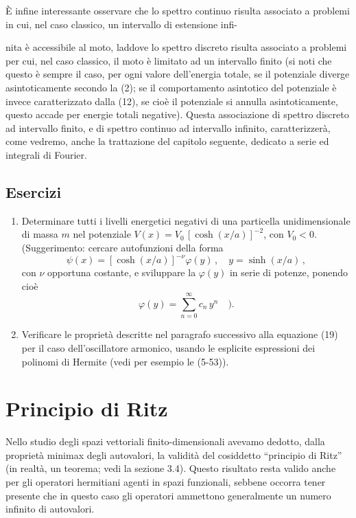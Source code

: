 \documentclass[11pt, a4paper]{book}
\numberwithin{equation}{section}
\newenvironment{esercizi}{\subsection*{Esercizi}\begin{enumerate}}{\end{enumerate}}
\begin{document}
È infine interessante osservare che lo spettro continuo risulta associato a problemi in cui, nel caso classico, un intervallo di estensione infi-


nita è accessibile al moto, laddove lo spettro discreto risulta associato a problemi per cui, nel caso classico, il moto è limitato ad un
intervallo finito (si noti che questo è sempre il caso, per ogni valore
dell'energia totale, se il potenziale diverge asintoticamente secondo
la (2); se il comportamento asintotico del potenziale è invece caratterizzato dalla (12), se cioè il potenziale si annulla asintoticamente, questo accade per energie totali negative). Questa associazione di spettro discreto ad
intervallo finito, e di spettro continuo ad intervallo infinito, caratterizzerà, come vedremo, anche la trattazione del capitolo seguente, dedicato a
serie ed integrali di Fourier.

\begin{esercizi}
\item Determinare tutti i livelli energetici negativi di una particella
unidimensionale di massa $m$ nel potenziale $V(x) = V_0\,[\cosh(x/a)]^{-2}$,
con $V_0 < 0$.\\
(Suggerimento: cercare autofunzioni della forma
\[
\psi(x) = \left[\cosh(x/a)\right]^{-\nu} \varphi(y) \,, \quad y = \sinh(x/a) \,,
\]
con $\nu$ opportuna costante, e sviluppare la $\varphi(y)$ in serie di potenze,
ponendo cioè
\[
\varphi(y) = \sum_{n=0}^{\infty} c_n\, y^n \quad ).
\]

\item Verificare le proprietà descritte nel paragrafo successivo alla equazione (19) per il caso dell'oscillatore armonico, usando le esplicite
espressioni dei polinomi di Hermite (vedi per esempio le (5-53)).
\end{esercizi}

\section{Principio di Ritz}

Nello studio degli spazi vettoriali finito-dimensionali avevamo dedotto,
dalla proprietà minimax degli autovalori, la validità del cosiddetto ``principio
di Ritz'' (in realtà, un teorema; vedi la sezione 3.4). Questo risultato resta
valido anche per gli operatori hermitiani agenti in spazi funzionali, sebbene
occorra tener presente che in questo caso gli operatori ammettono generalmente un numero infinito di autovalori.
\end{document}
